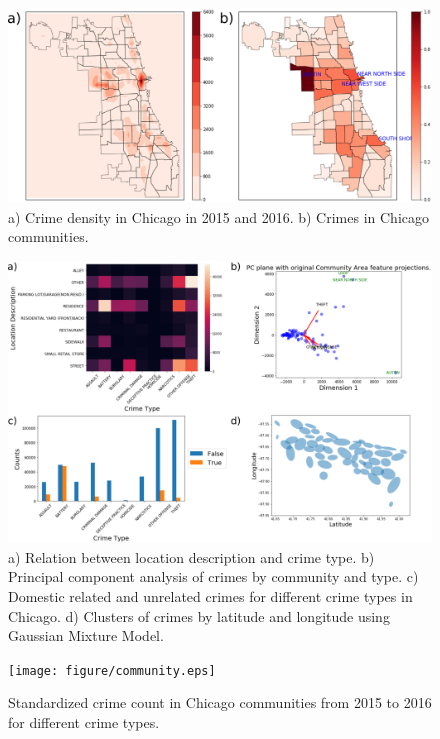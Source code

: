 \documentclass[12pt]{article}
\begin{document}
\begin{figure}[ht]
\includegraphics[scale=0.4]{figure/pos.eps}
\centering
\caption{a) Crime density in Chicago in 2015 and 2016. b) Crimes in Chicago communities.}
\label{fig:pos}
\end{figure}


\begin{figure}[ht]
\includegraphics[scale=0.3]{figure/location.eps}
\centering
\caption{a) Relation between location description and crime type. b) Principal component analysis of crimes by community and type. c) Domestic related and unrelated crimes for different crime types in Chicago. d) Clusters of crimes by latitude and longitude using Gaussian Mixture Model.}
\label{fig:location}
\end{figure}

\begin{figure}[ht]
\texttt{[image: figure/community.eps]}
\centering
\caption{Standardized crime count in Chicago communities from 2015 to 2016 for different crime types.}
\label{fig:community}
\end{figure}
\end{document}
